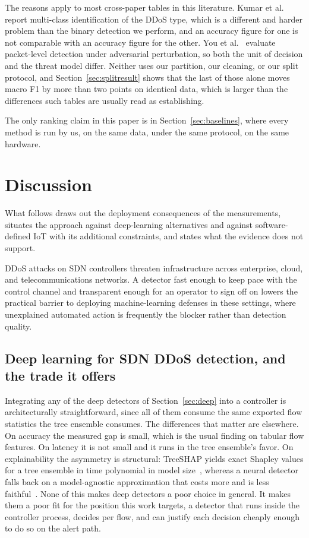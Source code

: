 \documentclass{ieeeaccess}
\begin{document}
The reasons apply to most cross-paper tables in this literature. Kumar et
al.~\cite{kumar2026meta} report multi-class identification of the DDoS type,
which is a different and harder problem than the binary detection we perform, and
an accuracy figure for one is not comparable with an accuracy figure for the
other. You et al.~\cite{you2026plaa} evaluate packet-level detection under
adversarial perturbation, so both the unit of decision and the threat model
differ. Neither uses our partition, our cleaning, or our split protocol, and
Section~\ref{sec:splitresult} shows that the last of those alone moves macro F1
by more than two points on identical data, which is larger than the differences
such tables are usually read as establishing.

The only ranking claim in this paper is in Section~\ref{sec:baselines}, where
every method is run by us, on the same data, under the same protocol, on the same
hardware.

\section{Discussion}
\label{sec:discussion}

What follows draws out the deployment consequences of the measurements, situates the approach against deep-learning alternatives and against software-defined IoT with its additional constraints, and states what the evidence does not support.

DDoS attacks on SDN controllers threaten infrastructure across enterprise, cloud, and telecommunications networks. A detector fast enough to keep pace with the control channel and transparent enough for an operator to sign off on lowers the practical barrier to deploying machine-learning defenses in these settings, where unexplained automated action is frequently the blocker rather than detection quality.

\subsection{Deep learning for SDN DDoS detection, and the trade it offers}
\label{sec:dl-discussion}
Integrating any of the deep detectors of Section~\ref{sec:deep} into a controller
is architecturally straightforward, since all of them consume the same exported
flow statistics the tree ensemble consumes. The differences that matter are
elsewhere. On accuracy the measured gap is small, which is the usual finding on
tabular flow features. On latency it is not small and it runs in the tree
ensemble's favor. On explainability the asymmetry is structural: TreeSHAP yields
exact Shapley values for a tree ensemble in time polynomial in model
size~\cite{lundberg2020treeshap}, whereas a neural detector falls back on a
model-agnostic approximation that costs more and is less
faithful~\cite{warnecke2020evaluating}. None of this makes deep detectors a poor
choice in general. It makes them a poor fit for the position this work targets, a
detector that runs inside the controller process, decides per flow, and can
justify each decision cheaply enough to do so on the alert path.
\end{document}
